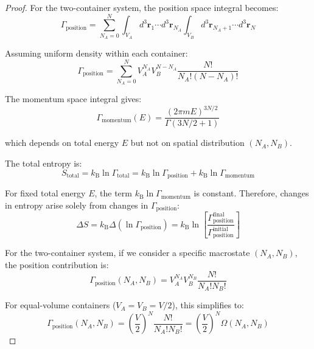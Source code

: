 \documentclass[10pt,twocolumn,letterpaper]{article}
\theoremstyle{definition}
\theoremstyle{remark}
\newcommand{\kb}{k_\text{B}}
\newcommand{\Om}{\Omega}
\begin{document}
\begin{proof}
For the two-container system, the position space integral becomes:
\begin{equation}
\Gamma_{\text{position}} = \sum_{N_A=0}^{N} \int_{V_A} d^3\mathbf{r}_1 \cdots d^3\mathbf{r}_{N_A} \int_{V_B} d^3\mathbf{r}_{N_A+1} \cdots d^3\mathbf{r}_N
\end{equation}

Assuming uniform density within each container:
\begin{equation}
\Gamma_{\text{position}} = \sum_{N_A=0}^{N} V_A^{N_A} V_B^{N-N_A} \frac{N!}{N_A! (N-N_A)!}
\label{eq:gamma_position_containers}
\end{equation}

The momentum space integral gives:
\begin{equation}
\Gamma_{\text{momentum}}(E) = \frac{(2\pi m E)^{3N/2}}{\Gamma(3N/2 + 1)}
\label{eq:gamma_momentum_energy}
\end{equation}

which depends on total energy $E$ but not on spatial distribution $(N_A, N_B)$.

The total entropy is:
\begin{equation}
S_{\text{total}} = \kb \ln \Gamma_{\text{total}} = \kb \ln \Gamma_{\text{position}} + \kb \ln \Gamma_{\text{momentum}}
\label{eq:entropy_factorized}
\end{equation}

For fixed total energy $E$, the term $\kb \ln \Gamma_{\text{momentum}}$ is constant. Therefore, changes in entropy arise solely from changes in $\Gamma_{\text{position}}$:
\begin{equation}
\Delta S = \kb \Delta(\ln \Gamma_{\text{position}}) = \kb \ln\left[\frac{\Gamma_{\text{position}}^{\text{final}}}{\Gamma_{\text{position}}^{\text{initial}}}\right]
\label{eq:entropy_change_position}
\end{equation}

For the two-container system, if we consider a specific macrostate $(N_A, N_B)$, the position contribution is:
\begin{equation}
\Gamma_{\text{position}}(N_A, N_B) = V_A^{N_A} V_B^{N_B} \frac{N!}{N_A! N_B!}
\end{equation}

For equal-volume containers ($V_A = V_B = V/2$), this simplifies to:
\begin{equation}
\Gamma_{\text{position}}(N_A, N_B) = \left(\frac{V}{2}\right)^N \frac{N!}{N_A! N_B!} = \left(\frac{V}{2}\right)^N \Om(N_A, N_B)
\end{equation}


\end{proof}
\end{document}
